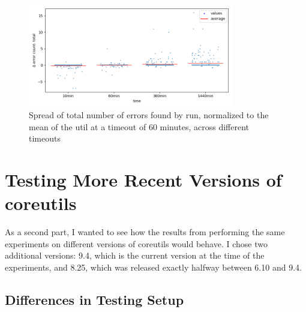 \documentclass{article}
\begin{document}
\begin{figure}[htbp]
    \centering
    \includegraphics[width=0.8\textwidth]{../plots/num_errors (total)/changes-by-time.png}
    \captionsetup{width=0.6\textwidth}
    \caption{Spread of total number of errors found by run, normalized to the mean of the util at a timeout of 60 minutes, across different timeouts}
    \label{fig:spread_across_times_errors}
\end{figure}

\section{Testing More Recent Versions of coreutils}
\label{SoftwareEvolution}

As a second part, I wanted to see how the results from performing the same experiments on different versions of coreutils would behave. I chose two additional versions: 9.4, which is the current version at the time of the experiments, and 8.25, which was released exactly halfway between 6.10 and 9.4.

\subsection{Differences in Testing Setup}
\end{document}
